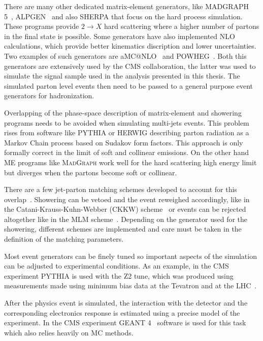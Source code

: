There are many other dedicated matrix-element generators, like \textsc{MADGRAPH 5}~\cite{ARTICLE:MadGraph5}, \textsc{ALPGEN}~\cite{ARTICLE:ALPGENGenerator} and also \textsc{SHERPA} that focus on the hard process simulation. These programs provide $2 \rightarrow X$ hard scattering where a higher number of partons in the final state is possible. Some generators have also implemented \gls{NLO} calculations, which provide better kinematics discription and lower uncertainties. Two examples of such generators are a\textsc{MC@NLO}~\cite{ARTICLE:aMCatNLO} and \textsc{POWHEG}~\cite{ARTICLE:POWHEG_2004,ARTICLE:POWHEG_2007,ARTICLE:POWHEG_2009v1,ARTICLE:POWHEG_2009v2,ARTICLE:POWHEG_2010v1,ARTICLE:POWHEG_2010v2,ARTICLE:POWHEG_2011v1,ARTICLE:POWHEG_2011v2}. Both this generators are extensively used by the \gls{CMS} collaboration, the latter was used to simulate the signal sample used in the analysis presented in this thesis. The simulated parton level events then need to be passed to a general purpose event generators for hadronization. 

Overlapping of the phase-space description of matrix-element and showering programs needs to be avoided when simulating multi-jets events. This problem rises from software like \textsc{PYTHIA} or \textsc{HERWIG} describing parton radiation as a Markov Chain process based on Sudakov form factors. This approach is only formally correct in the limit of soft and collinear emissions. On the other hand \gls{ME} programs like \textsc{MadGraph} work well for the hard scattering high energy limit but diverges when the partons become soft or collinear. 

There are a few jet-parton matching schemes developed to account for this overlap~\cite{ARTICLE:MatchingPartonShowersAndMatrixElements}. Showering can be vetoed and the event reweighed accordingly, like in the Catani-Krauss-Kuhn-Webber (CKKW) scheme~\cite{ARTICLE:CKKWSchemeRef1,ARTICLE:CKKWSchemeRef2,ARTICLE:CKKWSchemeRef3} or events can be rejected altogether like in the MLM scheme~\cite{ARTICLE:MLMScheme}. Depending on the generator used for the showering, different schemes are implemented and care must be taken in the definition of the matching parameters.

Most event generators can be finely tuned so important aspects of the simulation can be adjusted to experimental conditions. As an example, in the \gls{CMS} experiment \textsc{PYTHIA} is used with the Z2 tune, which was produced using measurements made using minimum bias data at the Tevatron and at the \gls{LHC}~\cite{ARTICLE:CMSMeasurementUnderlyingEventActivity}.  

After the physics event is simulated, the interaction with the detector and the corresponding electronics response is estimated using a precise model of the experiment. In the \gls{CMS} experiment \textsc{GEANT 4}~\cite{ARTICLE:GEANT4ASimulationToolkit,ARTICLE:Geant4DevelopmentsAndApplications} software is used for this task which also relies heavily on \gls{MC} methods.




